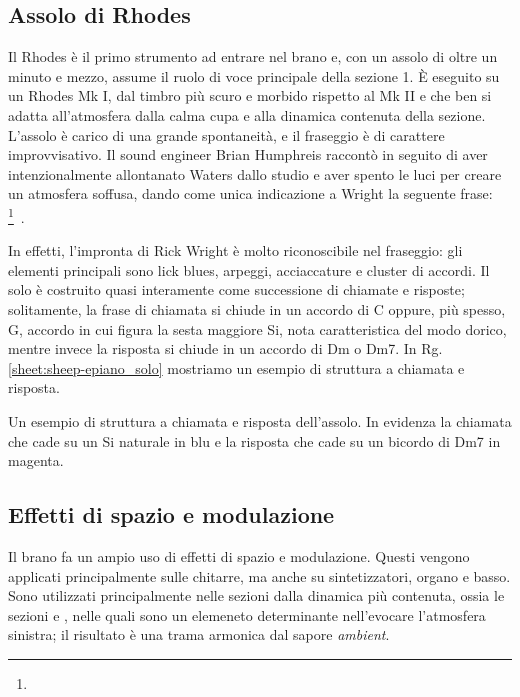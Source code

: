 \documentclass[class=book, crop=false, oneside, 12pt]{standalone}
\begin{document}
    \subsection{Assolo di Rhodes}
    Il Rhodes è il primo strumento ad entrare nel brano e, con un assolo di oltre un minuto e mezzo, assume il ruolo di voce principale della sezione 1. È eseguito su un Rhodes Mk I, dal timbro più scuro e morbido rispetto al Mk II e che ben si adatta all'atmosfera dalla calma cupa e alla dinamica contenuta della sezione. L'assolo è carico di una grande spontaneità, e il fraseggio è di carattere improvvisativo. Il sound engineer Brian Humphreis raccontò in seguito di aver intenzionalmente allontanato Waters dallo studio e aver spento le luci per creare un atmosfera soffusa, dando come unica indicazione a Wright la seguente frase: \footnote{}~\cite{easlea2022raving}.

    
    In effetti, l'impronta di Rick Wright è molto riconoscibile nel fraseggio: gli elementi principali sono lick blues, arpeggi, acciaccature e cluster di accordi. Il solo è costruito quasi interamente come successione di chiamate e risposte; solitamente, la frase di chiamata si chiude in un accordo di C oppure, più spesso, G, accordo in cui figura la sesta maggiore Si, nota caratteristica del modo dorico, mentre invece la risposta si chiude in un accordo di Dm o Dm7. In Rg.\ref{sheet:sheep-epiano_solo} mostriamo un esempio di struttura a chiamata e risposta.

    \begin{sheet}[htb]
        \centering
        \caption[Un esempio di struttura a chiamata e risposta dell'assolo.]{Un esempio di struttura a chiamata e risposta dell'assolo. In evidenza la chiamata che cade su un Si naturale in blu e la risposta che cade su un bicordo di Dm7 in magenta.}
        \label{sheet:sheep-epiano_solo}
    \end{sheet}

    \subsection{Effetti di spazio e modulazione}
    Il brano fa un ampio uso di effetti di spazio e modulazione. Questi vengono applicati principalmente sulle chitarre, ma anche su sintetizzatori, organo e basso. Sono utilizzati principalmente nelle sezioni dalla dinamica più contenuta, ossia le sezioni  e , nelle quali sono un elemeneto determinante nell'evocare l'atmosfera sinistra; il risultato è una trama armonica dal sapore \emph{ambient}.
\end{document}
